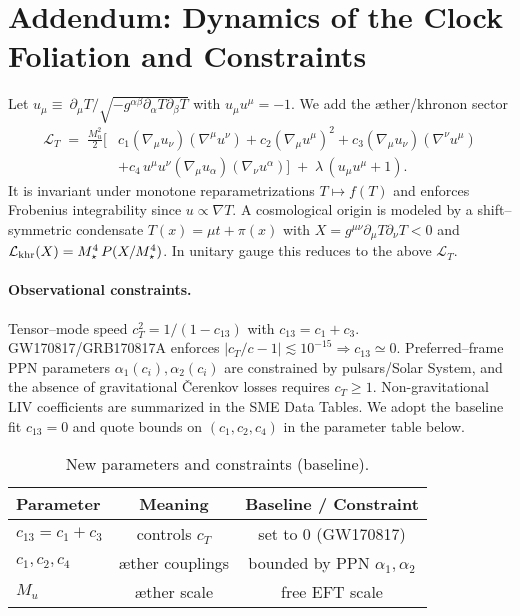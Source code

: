 \clearpage
\section*{Addendum: Dynamics of the Clock Foliation and Constraints}
Let \(u_\mu \equiv \ \partial_\mu T/\sqrt{-g^{\alpha\beta}\partial_\alpha T\partial_\beta T}\) with \(u_\mu u^\mu=-1\). We add the æther/khronon sector
\begin{align}
\mathcal L_{T} \;=\; \frac{M_u^{2}}{2}\Big[&c_1(\nabla_\mu u_\nu)(\nabla^\mu u^\nu)+c_2(\nabla_\mu u^\mu)^2+c_3(\nabla_\mu u_\nu)(\nabla^\nu u^\mu)\\
&+c_4\,u^\mu u^\nu (\nabla_\mu u_\alpha)(\nabla_\nu u^\alpha)\Big]
\;+\;\lambda\,(u_\mu u^\mu+1).\nonumber
\end{align}
It is invariant under monotone reparametrizations \(T\!\mapsto f(T)\) and enforces Frobenius integrability since \(u\propto\nabla T\).
A cosmological origin is modeled by a shift--symmetric condensate \(T(x)=\mu t+\pi(x)\) with \(X=g^{\mu\nu}\partial_\mu T\partial_\nu T<0\) and
\(\mathcal L_{\rm khr}(X)=M_\star^4\,P(X/M_\star^4)\). In unitary gauge this reduces to the above \(\mathcal L_T\).

\paragraph{Observational constraints.}
Tensor--mode speed \(c_T^2=1/(1-c_{13})\) with \(c_{13}\!=\!c_1+c_3\). GW170817/GRB170817A enforces \(|c_T/c-1|\!\lesssim\!10^{-15}\Rightarrow c_{13}\!\simeq\!0\).
Preferred--frame PPN parameters \(\alpha_1(c_i),\alpha_2(c_i)\) are constrained by pulsars/Solar System, and the absence of gravitational
\v{C}erenkov losses requires \(c_T\ge 1\). Non-gravitational LIV coefficients are summarized in the SME Data Tables.
We adopt the baseline fit \(c_{13}=0\) and quote bounds on \((c_1,c_2,c_4)\) in the parameter table below.

\begin{table}[h]
\centering
\caption{New parameters and constraints (baseline).}
\begin{tabular}{lcc}
\hline
Parameter & Meaning & Baseline / Constraint \\
\hline
\(c_{13}=c_1+c_3\) & controls \(c_T\) & set to 0 (GW170817) \\
\(c_1,c_2,c_4\) & æther couplings & bounded by PPN \(\alpha_1,\alpha_2\) \\
\(M_u\) & æther scale & free EFT scale \\
\hline
\end{tabular}
\end{table}

